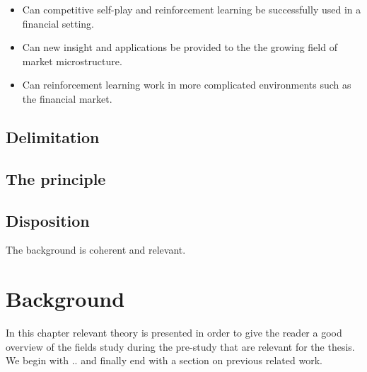 \documentclass{kththesis}
\theoremstyle{definition}
\begin{document}
\begin{itemize}
    \item Can competitive self-play and reinforcement learning be successfully used in a financial setting. 
    \item Can new insight and applications be provided to the the growing field of market microstructure. 
    \item Can reinforcement learning work in more complicated environments such as the financial market.
\end{itemize}


\section{Delimitation}

\section{The principle}

\section{Disposition}


The background is coherent and relevant.
\chapter{Background}
In this chapter relevant theory is presented in order to give the reader a good overview of the fields study during the pre-study that are relevant for the thesis. We begin with .. and finally end with a section on previous related work.





\end{document}
